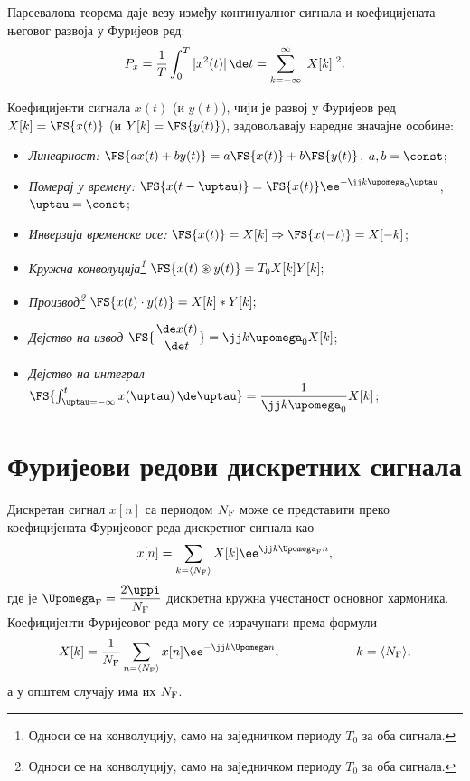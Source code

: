 \noindent 
Парсевалова теорема даје везу између  континуалног сигнала и коефицијената
његовог развоја у Фуријеов ред:
\begin{equation}
P_x = \dfrac{1}{T} \int_{0}^{T} |x^2(t)|\,\de t = \sum_{k=-\infty}^{\infty} |X[k]|^2. \label{eq:ctfs_parseval}
\end{equation}

Коефицијенти сигнала $x(t)$ (и $y(t)$), чији је развој у Фуријеов ред
$X[k] = \FS{x(t)}$ (и $Y[k] = \FS{y(t)}$),
задовољавају наредне значајне особине: 
\begin{itemize}\itemsep0pt
    \item \emph{Линеарност:}  $\FS{ax(t) + by(t)} = a \FS{x(t)} + b \FS{y(t)}$, $a,b = \const$;
    \item \emph{Померај у времену:} $ \FS{x(t-\uptau)} = \FS{x(t)} \ee^{-\jj k \upomega_{\rm 0} \uptau}$, $\uptau = \const$;
    \item \emph{Инверзија временске осе:} $\FS{x(t)} = X[k] \Rightarrow \FS{x(-t)} = X[-k] $;
    \item \emph{Кружна конволуција\footnote{Односи се на конволуцију, само на заједничком периоду $T_0$ за оба сигнала.}}
    $
    \FS{x(t) \circledast y(t)} = T_0 X[k] Y[k];
    $
    \item \emph{Производ\footnote{Односи се на конволуцију, само на заједничком периоду $T_0$ за оба сигнала.}}
    $
    \FS{x(t) \cdot y(t)} = X[k] \ast Y[k];
    $
    \item \emph{Дејство на извод} $\FS{ \dfrac{\de x(t)}{\de t} } = \jj k \upomega_0 X[k]$;
    \item \emph{Дејство на интеграл} $\FS{ \int_{\uptau = -\infty}^t x(\uptau) \, \de \uptau } = \dfrac{1}{\jj k \upomega_0} X[k]$;
\end{itemize}

\section*{Фуријеови редови дискретних сигнала}

Дискретан сигнал $x[n]$ са периодом $N_{\rm F}$ може се представити преко коефицијената Фуријеовог 
реда дискретног сигнала као
\begin{eqnarray}
    x[n] = \sum_{k = \langle N_{\rm F} \rangle } X[k] \ee^{ \jj k \Upomega_{\rm F} n }, 
\end{eqnarray}
где је $\Upomega_{\rm F} = \dfrac{2\uppi}{N_{\rm F}}$ дискретна кружна учестаност основног хармоника. Коефицијенти 
Фуријеовог реда могу се израчунати према формули 
\begin{equation}
    X[k] = \dfrac{1}{N_{\rm F}} \sum_{n = \langle N_{\rm F} \rangle} x[n] \ee^{-\jj k \Upomega n}, 
    \qquad\qquad\qquad
    k = \langle N_{\rm F} \rangle,
\end{equation}
а у општем случају има их $N_{\rm F}$. 

